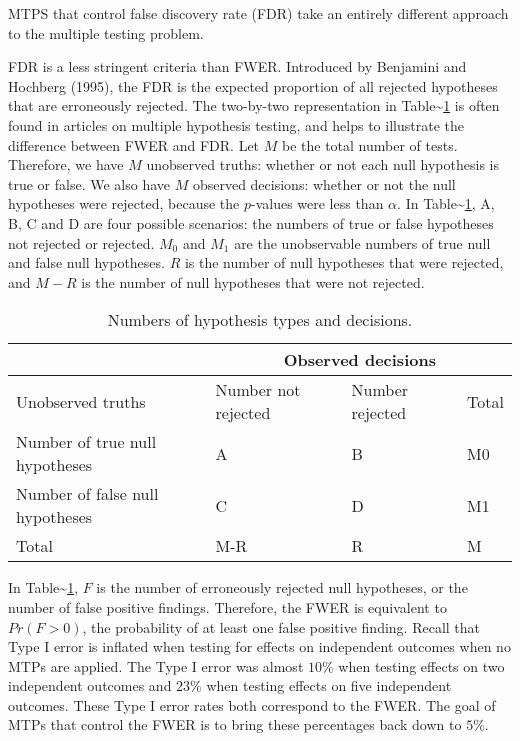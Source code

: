 \documentclass[
]{article}
\begin{document}
MTPS that control false discovery rate (FDR) take an entirely different
approach to the multiple testing problem.

FDR is a less stringent criteria than FWER. Introduced by Benjamini and
Hochberg (1995), the FDR is the expected proportion of all rejected
hypotheses that are erroneously rejected. The two-by-two representation
in Table\textasciitilde{}\ref{tab:twobytwo} is often found in articles
on multiple hypothesis testing, and helps to illustrate the difference
between FWER and FDR. Let \(M\) be the total number of tests. Therefore,
we have \(M\) unobserved truths: whether or not each null hypothesis is
true or false. We also have \(M\) observed decisions: whether or not the
null hypotheses were rejected, because the \(p\)-values were less than
\(\alpha\). In Table\textasciitilde{}\ref{tab:twobytwo}, A, B, C and D
are four possible scenarios: the numbers of true or false hypotheses not
rejected or rejected. \(M_0\) and \(M_1\) are the unobservable numbers
of true null and false null hypotheses. \(R\) is the number of null
hypotheses that were rejected, and \(M - R\) is the number of null
hypotheses that were not rejected.

\begin{table}[h!]
\centering
\begin{tabular}{l l l l}
                                      & \multicolumn{3}{c}{Observed decisions}\\ \hline
Unobserved truths                     & Number not rejected     & Number rejected   & Total \\ \hline
Number of true null hypotheses        & A                       & B                 & M0 \\
Number of false null hypotheses       & C                       & D                 & M1 \\ \hline
Total                                 & M-R                     & R                 & M
\end{tabular}
\caption{Numbers of hypothesis types and decisions.}
  \label{tab:twobytwo}
\end{table}

In Table\textasciitilde{}\ref{tab:twobytwo}, \(F\) is the number of
erroneously rejected null hypotheses, or the number of false positive
findings. Therefore, the FWER is equivalent to \(Pr(F > 0)\), the
probability of at least one false positive finding. Recall that Type I
error is inflated when testing for effects on independent outcomes when
no MTPs are applied. The Type I error was almost \(10\%\) when testing
effects on two independent outcomes and \(23\%\) when testing effects on
five independent outcomes. These Type I error rates both correspond to
the FWER. The goal of MTPs that control the FWER is to bring these
percentages back down to \(5\%\).
\end{document}
